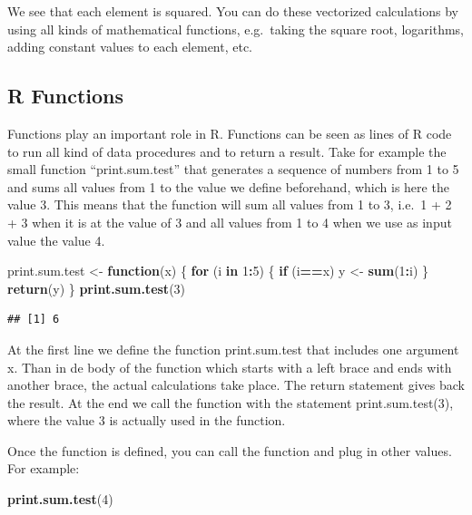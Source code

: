 \documentclass[]{book}
\newenvironment{Shaded}{\begin{snugshade}}{\end{snugshade}}
\newcommand{\KeywordTok}[1]{\textcolor[rgb]{0.13,0.29,0.53}{\textbf{#1}}}
\newcommand{\DecValTok}[1]{\textcolor[rgb]{0.00,0.00,0.81}{#1}}
\newcommand{\StringTok}[1]{\textcolor[rgb]{0.31,0.60,0.02}{#1}}
\newcommand{\ControlFlowTok}[1]{\textcolor[rgb]{0.13,0.29,0.53}{\textbf{#1}}}
\newcommand{\OperatorTok}[1]{\textcolor[rgb]{0.81,0.36,0.00}{\textbf{#1}}}
\newcommand{\NormalTok}[1]{#1}
\begin{document}
We see that each element is squared. You can do these vectorized
calculations by using all kinds of mathematical functions, e.g.~taking
the square root, logarithms, adding constant values to each element,
etc.

\subsection{R Functions}\label{r-functions}

Functions play an important role in R. Functions can be seen as lines of
R code to run all kind of data procedures and to return a result. Take
for example the small function ``print.sum.test'' that generates a
sequence of numbers from 1 to 5 and sums all values from 1 to the value
we define beforehand, which is here the value 3. This means that the
function will sum all values from 1 to 3, i.e.~1 + 2 + 3 when it is at
the value of 3 and all values from 1 to 4 when we use as input value the
value 4.

\begin{Shaded}
\begin{Highlighting}[]
\NormalTok{print.sum.test <-}\StringTok{ }\ControlFlowTok{function}\NormalTok{(x) }
\NormalTok{\{}
 \ControlFlowTok{for}\NormalTok{ (i }\ControlFlowTok{in} \DecValTok{1}\OperatorTok{:}\DecValTok{5}\NormalTok{) }
\NormalTok{ \{}
   \ControlFlowTok{if}\NormalTok{ (i}\OperatorTok{==}\NormalTok{x) y <-}\StringTok{ }\KeywordTok{sum}\NormalTok{(}\DecValTok{1}\OperatorTok{:}\NormalTok{i)  }
\NormalTok{ \}}
\KeywordTok{return}\NormalTok{(y)}
\NormalTok{\}}
\KeywordTok{print.sum.test}\NormalTok{(}\DecValTok{3}\NormalTok{)}
\end{Highlighting}
\end{Shaded}

\begin{verbatim}
## [1] 6
\end{verbatim}

At the first line we define the function print.sum.test that includes
one argument x. Than in de body of the function which starts with a left
brace and ends with another brace, the actual calculations take place.
The return statement gives back the result. At the end we call the
function with the statement print.sum.test(3), where the value 3 is
actually used in the function.

Once the function is defined, you can call the function and plug in
other values. For example:

\begin{Shaded}
\begin{Highlighting}[]
\KeywordTok{print.sum.test}\NormalTok{(}\DecValTok{4}\NormalTok{)}
\end{Highlighting}
\end{Shaded}
\end{document}
